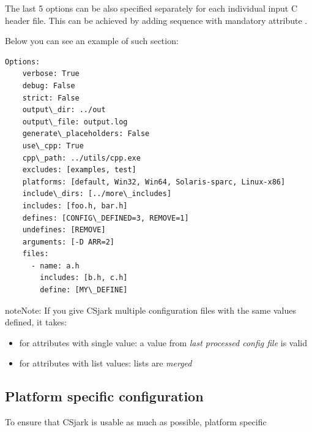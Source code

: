 \documentclass[A4paper,10pt,english]{sphinxmanual}
\begin{document}
The last 5 options can be also specified separately for each individual input C header file. This can be achieved by adding sequence  with mandatory attribute .

Below you can see an example of such  section:

\begin{Verbatim}[commandchars=\\\{\}]
Options:
    verbose: True
    debug: False
    strict: False
    output\_dir: ../out
    output\_file: output.log
    generate\_placeholders: False
    use\_cpp: True
    cpp\_path: ../utils/cpp.exe
    excludes: [examples, test]
    platforms: [default, Win32, Win64, Solaris-sparc, Linux-x86]
    include\_dirs: [../more\_includes]
    includes: [foo.h, bar.h]
    defines: [CONFIG\_DEFINED=3, REMOVE=1]
    undefines: [REMOVE]
    arguments: [-D ARR=2]
    files:
      - name: a.h
        includes: [b.h, c.h]
        define: [MY\_DEFINE]
\end{Verbatim}

\begin{notice}{note}{Note:}
If you give CSjark multiple configuration files with the same values defined, it takes:
\begin{itemize}
\item {} 
for attributes with single value: a value from \emph{last processed config file} is valid

\item {} 
for attributes with list values: lists are \emph{merged}

\end{itemize}
\end{notice}


\subsection{Platform specific configuration}
\label{user/config:platform-specific-configuration}
To ensure that CSjark is usable as much as possible, platform specific
\end{document}
